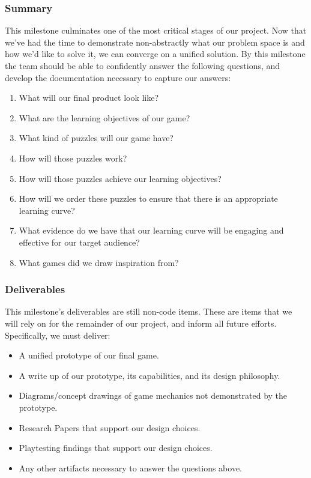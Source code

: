 \subsubsection*{Summary}
This milestone culminates one of the most critical stages of our project. Now
that we’ve had the time to demonstrate non-abstractly what our problem space is
and how we’d like to solve it, we can converge on a unified solution. By this
milestone the team should be able to confidently answer the following questions,
and develop the documentation necessary to capture our answers:
\begin{enumerate}
	\item What will our final product look like?
	\item What are the learning objectives of our game?
	\item What kind of puzzles will our game have?
	\item How will those puzzles work?
	\item How will those puzzles achieve our learning objectives?
	\item How will we order these puzzles to ensure that there is an appropriate
	learning curve?
	\item What evidence do we have that our learning curve will be engaging and
	effective for our target audience?
	\item What games did we draw inspiration from?
\end{enumerate}

\subsubsection*{Deliverables}
This milestone’s deliverables are still non-code items. These are items that we
will rely on for the remainder of our project, and inform all future efforts.
Specifically, we must deliver:
\begin{itemize}
	\item A unified prototype of our final game.
	\item A write up of our prototype, its capabilities, and its design philosophy.
	\item Diagrams/concept drawings of game mechanics not demonstrated by the prototype.
	\item Research Papers that support our design choices.
	\item Playtesting findings that support our design choices.
	\item Any other artifacts necessary to answer the questions above.
\end{itemize}

